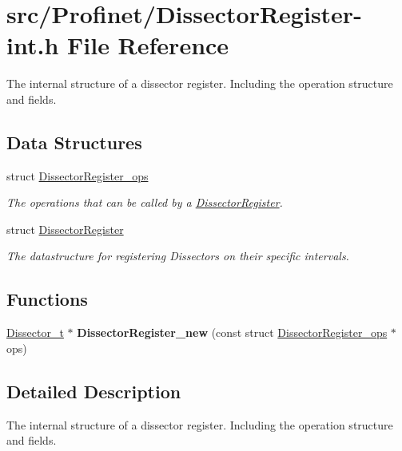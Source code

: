 \hypertarget{_dissector_register-int_8h}{}\section{src/\+Profinet/\+Dissector\+Register-\/int.h File Reference}
\label{_dissector_register-int_8h}


The internal structure of a dissector register. Including the operation structure and fields.  


\subsection*{Data Structures}
\begin{DoxyCompactItemize}
\item 
struct \hyperlink{struct_dissector_register__ops}{Dissector\+Register\+\_\+ops}
\begin{DoxyCompactList}\small\item\em The operations that can be called by a \hyperlink{struct_dissector_register}{Dissector\+Register}. \end{DoxyCompactList}\item 
struct \hyperlink{struct_dissector_register}{Dissector\+Register}
\begin{DoxyCompactList}\small\item\em The datastructure for registering Dissectors on their specific intervals. \end{DoxyCompactList}\end{DoxyCompactItemize}
\subsection*{Functions}
\begin{DoxyCompactItemize}
\item 
\hypertarget{_dissector_register-int_8h_a1fc9ce5db61206b38e9bfb2b6d7bebd0}{}\hyperlink{struct_dissector}{Dissector\+\_\+t} $\ast$ {\bfseries Dissector\+Register\+\_\+new} (const struct \hyperlink{struct_dissector_register__ops}{Dissector\+Register\+\_\+ops} $\ast$ops)\label{_dissector_register-int_8h_a1fc9ce5db61206b38e9bfb2b6d7bebd0}

\end{DoxyCompactItemize}


\subsection{Detailed Description}
The internal structure of a dissector register. Including the operation structure and fields. 

